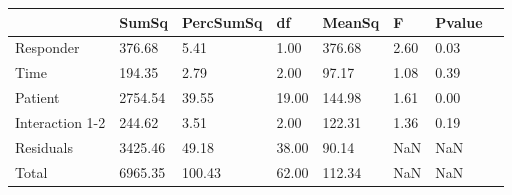 \begin{tabular}{llllllll}
 & SumSq & PercSumSq & df & MeanSq & F & Pvalue \\ 
 \hline 
Responder & 376.68 & 5.41 & 1.00 & 376.68 & 2.60 & 0.03 \\ 
Time & 194.35 & 2.79 & 2.00 & 97.17 & 1.08 & 0.39 \\ 
Patient & 2754.54 & 39.55 & 19.00 & 144.98 & 1.61 & 0.00 \\ 
Interaction 1-2 & 244.62 & 3.51 & 2.00 & 122.31 & 1.36 & 0.19 \\ 
Residuals & 3425.46 & 49.18 & 38.00 & 90.14 & NaN & NaN \\ 
Total & 6965.35 & 100.43 & 62.00 & 112.34 & NaN & NaN \\ 
\end{tabular} 
